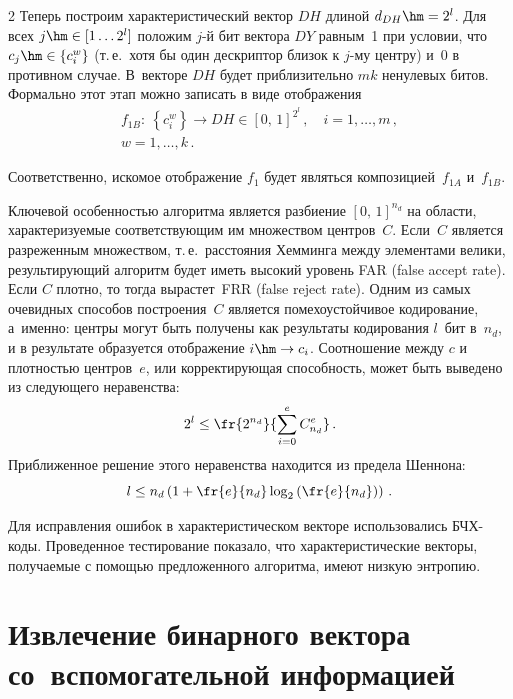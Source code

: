 \begin{multicols}{2}
      Теперь построим характеристический вектор $DH$ длиной $d_{DH}\hm = 2^l$. Для 
всех $j\hm\in [1\ldots 2^l]$ положим $j$-й бит вектора $DY$ равным~1 при условии, что 
$c_j\hm\in \left\{ c_i^w\right\}$ (т.\,е.\ хотя бы один дескриптор близок к $j$-му центру) 
и~0 в противном случае. В~векторе $DH$ будет приблизительно $mk$ ненулевых битов. 
Формально этот этап можно записать в виде отоб\-ра\-жения
      \begin{multline*}
      f_{1B}:\ \left\{ c_i^w\right\}\rightarrow DH\in [0,\,1]^{2^l}\,,\quad i=1, \ldots ,m\,,\\ 
w=1,\ldots , k\,.
      \end{multline*}
      
      Соответственно, искомое отображение $f_1$ будет являться 
композицией~$f_{1A}$ и~$f_{1B}$.
      
      Ключевой особенностью алгоритма является разбиение $[0,\,1]^{n_d}$ на области, 
характеризуемые соответствующим им множеством центров~$C$. Если~$C$ является 
разреженным множеством, т.\,е.\ расстояния Хемминга между элементами велики, 
результирующий алгоритм будет иметь высокий уровень FAR (false accept rate). 
Если $C$ плот\-но, то тогда вырастет~FRR (false reject rate). 
Одним из самых очевидных способов построения~$C$ является 
помехоустойчивое кодирование, а~именно: центры могут быть получены как результаты 
кодирования $l$~бит в~$n_d$, и в результате образуется отображение $i\hm\rightarrow c_i$. 
Соотношение между $c$ и плотностью центров~$e$, или корректирующая способность, 
может быть выведено из следующего неравенства:
      \begin{equation*}
      2^l\leq \fr{2^{n_d}}{\sum\limits_{i=0}^e C^e_{n_d}}\,.
      \end{equation*}
      Приближенное решение этого неравенства находится из предела Шеннона:
      \begin{equation*}
      l\leq n_d\left( 1+\fr{e}{n_d}\log_2\left( \fr{e}{n_d}\right)\right)\,.
      \end{equation*}
      
      Для исправления ошибок в характеристическом векторе использовались 
      БЧХ-ко\-ды. Проведенное тестирование показало, что характеристические векторы, 
получаемые с помощью предложенного алгоритма, имеют низкую энтропию. 

\section{Извлечение бинарного вектора со~вспомогательной 
информацией}


\end{multicols}
